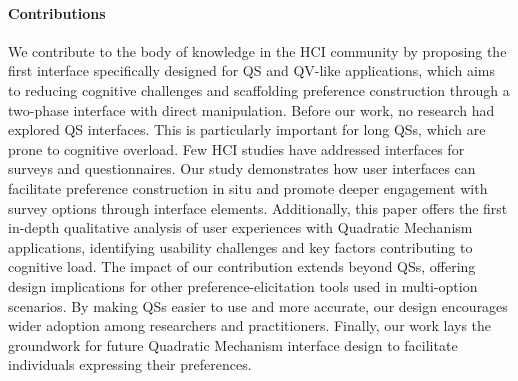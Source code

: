 \paragraph{Contributions}
We contribute to the body of knowledge in the HCI community by proposing the first interface specifically designed for QS and QV-like applications, which aims to reducing cognitive challenges and scaffolding preference construction through a two-phase interface with direct manipulation. Before our work, no research had explored QS interfaces. This is particularly important for long QSs, which are prone to cognitive overload. Few HCI studies have addressed interfaces for surveys and questionnaires. Our study demonstrates how user interfaces can facilitate preference construction in situ and promote deeper engagement with survey options through interface elements. Additionally, this paper offers the first in-depth qualitative analysis of user experiences with Quadratic Mechanism applications, identifying usability challenges and key factors contributing to cognitive load. The impact of our contribution extends beyond QSs, offering design implications for other preference-elicitation tools used in multi-option scenarios. By making QSs easier to use and more accurate, our design encourages wider adoption among researchers and practitioners. Finally, our work lays the groundwork for future Quadratic Mechanism interface design to facilitate individuals expressing their preferences.